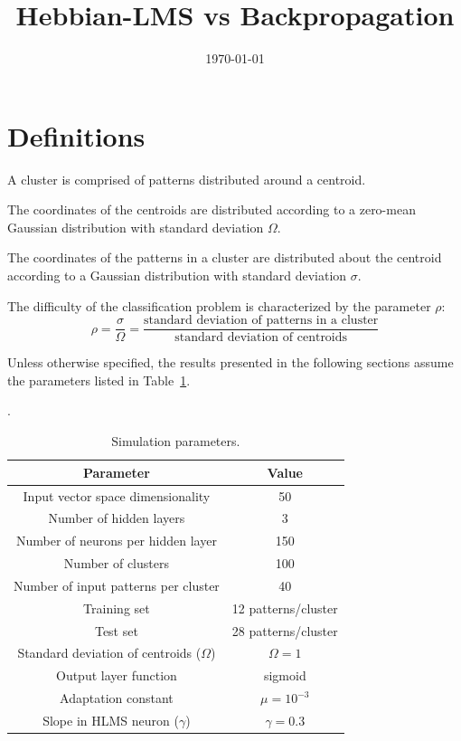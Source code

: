 \documentclass[a4paper]{article}
\title{Hebbian-LMS vs Backpropagation}
\date{\today}
\begin{document}
\maketitle

\section*{Definitions}

A cluster is comprised of patterns distributed around a centroid.

The coordinates of the centroids are distributed according to a zero-mean Gaussian distribution with standard deviation $\Omega$. 

The coordinates of the patterns in a cluster are distributed about the centroid according to a Gaussian distribution with standard deviation $\sigma$. 

The difficulty of the classification problem is characterized by the parameter $\rho$:
\begin{equation}
	\rho = \frac{\sigma}{\Omega} = \frac{\text{standard deviation of patterns in a cluster}}{\text{standard deviation of centroids}} 
\end{equation}


Unless otherwise specified, the results presented in the following sections assume the parameters listed in Table~\ref{tab:param}.

\begin{table}[!h]
	\centering
	\caption{Simulation parameters.} \label{tab:param}.
	\begin{tabular}{c|c}
		Parameter & Value \\
		\hline
		Input vector space dimensionality & 50 \\
		Number of hidden layers & 3 \\
		Number of neurons per hidden layer & 150 \\
		Number of clusters & 100 \\
		Number of input patterns per cluster & 40 \\
		Training set & 12 patterns/cluster \\
		Test set & 28 patterns/cluster \\		 
		Standard deviation of centroids ($\Omega$) & $\Omega = 1$ \\
		Output layer function & sigmoid \\
		Adaptation constant & $\mu = 10^{-3}$ \\
		Slope in HLMS neuron ($\gamma$) & $\gamma = 0.3$ \\
		\hline
	\end{tabular}
\end{table}
\end{document}

